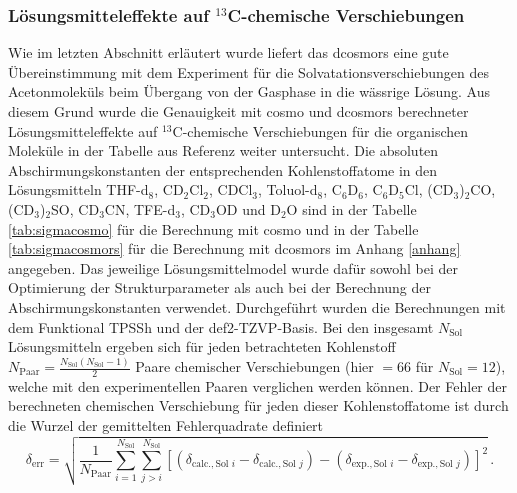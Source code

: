 	\subsubsection{Lösungsmitteleffekte auf \texorpdfstring{$^{13}$C}{13C}-chemische Verschiebungen}
	Wie im letzten Abschnitt erläutert wurde liefert das \ac{dcosmors} eine gute Übereinstimmung mit dem Experiment für die Solvatationsverschiebungen des Acetonmoleküls beim Übergang von der Gasphase in die wässrige Lösung. Aus diesem Grund wurde die Genauigkeit mit \ac{cosmo} und \ac{dcosmors} berechneter Lösungsmitteleffekte auf $^{13}$C-chemische Verschiebungen für die organischen Moleküle in der Tabelle aus Referenz \cite{fulmer2010nmr} weiter untersucht. Die absoluten Abschirmungskonstanten der entsprechenden Kohlenstoffatome in den Lösungsmitteln THF-d$_{8}$, CD$_{2}$Cl$_{2}$, CDCl$_{3}$, Toluol-d$_{8}$, C$_{6}$D$_{6}$, C$_{6}$D$_{5}$Cl, (CD$_{3}$)$_{2}$CO, (CD$_{3}$)$_{2}$SO, CD$_{3}$CN, TFE-d$_{3}$, CD$_{3}$OD und D$_{2}$O sind in der Tabelle \ref{tab:sigmacosmo} für die Berechnung mit \ac{cosmo} und in der Tabelle \ref{tab:sigmacosmors} für die Berechnung mit \ac{dcosmors} im Anhang \ref{anhang} angegeben. Das jeweilige Lösungsmittelmodel wurde dafür sowohl bei der Optimierung der Strukturparameter als auch bei der Berechnung der Abschirmungskonstanten verwendet. Durchgeführt wurden die Berechnungen mit dem Funktional TPSSh\supercite{staroverov2003comparative} und der def2-TZVP-Basis\supercite{weigend2005balanced}. Bei den insgesamt $N_{\textrm{Sol}}$ Lösungsmitteln ergeben sich für jeden betrachteten Kohlenstoff $N_{\textrm{Paar}}=\frac{N_{\textrm{Sol}}(N_{\textrm{Sol}}-1)}{2}$ Paare chemischer Verschiebungen (hier $=66$ für $N_{\textrm{Sol}}=12$), welche mit den experimentellen Paaren verglichen werden können. Der Fehler der berechneten chemischen Verschiebung für jeden dieser Kohlenstoffatome ist durch die Wurzel der gemittelten Fehlerquadrate definiert
	\begin{equation}
	\delta_{\textrm{err}}=\sqrt{\frac{1}{N_{\textrm{Paar}}}\sum_{i=1}^{N_{\textrm{Sol}}}\sum_{j>i}^{N_{\textrm{Sol}}}\left[\left(\delta_{\textrm{calc.},{\textrm{Sol }i}}-\delta_{\textrm{calc.},{\textrm{Sol }j}}\right)-\left(\delta_{\textrm{exp.},{\textrm{Sol }i}}-\delta_{\textrm{exp.},{\textrm{Sol }j}}\right)\right]^2}\, .
	\end{equation}

